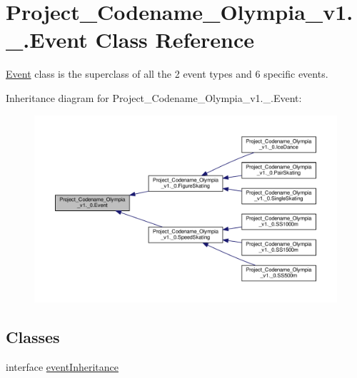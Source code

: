 \hypertarget{classProject__Codename__Olympia__v1_1_1__0_1_1Event}{}\section{Project\+\_\+\+Codename\+\_\+\+Olympia\+\_\+v1.\+\_.\+Event Class Reference}
\label{classProject__Codename__Olympia__v1_1_1__0_1_1Event}


\hyperlink{classProject__Codename__Olympia__v1_1_1__0_1_1Event}{Event} class is the superclass of all the 2 event types and 6 specific events.  




Inheritance diagram for Project\+\_\+\+Codename\+\_\+\+Olympia\+\_\+v1.\+\_.\+Event\+:
\nopagebreak
\begin{figure}[H]
\begin{center}
\leavevmode
\includegraphics[width=350pt]{classProject__Codename__Olympia__v1_1_1__0_1_1Event__inherit__graph}
\end{center}
\end{figure}
\subsection*{Classes}
\begin{DoxyCompactItemize}
\item 
interface \hyperlink{interfaceProject__Codename__Olympia__v1_1_1__0_1_1Event_1_1eventInheritance}{event\+Inheritance}
\end{DoxyCompactItemize}
